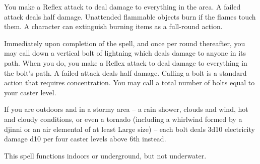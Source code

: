 \begin{spelleffect}
    You make a Reflex attack to deal damage to everything in the area. A failed attack deals half damage. Unattended flammable objects burn if the flames touch them. A character can extinguish burning items as a full-round action.
\end{spelleffect}

\begin{comment}
\subsubsection{C}
\end{comment}

\spellrng{\rngmed}
\begin{spelleffect}
  Immediately upon completion of the spell, and once per round thereafter, you may call down a vertical bolt of lightning which deals damage to anyone in its path. When you do, you make a Reflex attack to deal damage to everything in the bolt's path. A failed attack deals half damage. Calling a bolt is a standard action that requires concentration. You may call a total number of bolts equal to your caster level.
  \par If you are outdoors and in a stormy area -- a rain shower, clouds and wind, hot and cloudy conditions, or even a tornado (including a whirlwind formed by a djinni or an air elemental of at least Large size) -- each bolt deals 3d10 electricity damage \add d10 per four caster levels above 6th instead.
\end{spelleffect}
\begin{spellnotes}
  This spell functions indoors or underground, but not underwater.
\end{spellnotes}

